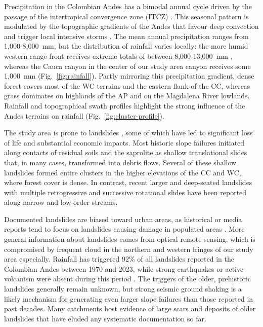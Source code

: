 \documentclass[draft]{agujournal2019}
\begin{document}
\par Precipitation in the Colombian Andes has a bimodal annual cycle driven by the passage of the intertropical convergence zone (ITCZ) \cite{bedoya2019}. This seasonal pattern is modulated by the topographic gradients of the Andes that favour deep convection and trigger local intensive storms \cite{Poveda2011}. The mean annual precipitation ranges from 1,000-8,000~mm, but the distribution of rainfall varies locally: the more humid western range front receives extreme totals of between 8,000-13,000~mm \cite{poveda2000existence,smith2006progress}, whereas the Cauca canyon in the center of our study area canyon receives some 1,000~mm (Fig.~\ref{fig:rainfall}). Partly mirroring this precipitation gradient, dense forest covers most of the WC terrains and the eastern flank of the CC, whereas grass dominates on highlands of the AP and on the Magdalena River lowlands. Rainfall and topographical swath profiles highlight the strong influence of the Andes terrains on rainfall (Fig.~\ref{fig:cluster-profile}).

\par The study area is prone to landslides \cite{aristizabal2020spatial, gomez2023spatial}, some of which have led to significant loss of life and substantial economic impacts. Most historic slope failures initiated along contacts of residual soils and the saprolite as shallow translational slides that, in many cases, transformed into debris flows. Several of these shallow landslides formed entire clusters in the higher elevations of the CC and WC, where forest cover is dense. In contrast, recent larger and deep-seated landslides with multiple retrogressive and successive rotational slides have been reported along narrow and low-order streams.

\par Documented landslides are biased toward urban areas, as historical or media reports tend to focus on landslides causing damage in populated areas \cite{guzzetti2012landslide, froude2018global}. More general information about landslides comes from optical remote sensing, which is compromised by frequent cloud in the northern and western fringes of our study area especially. Rainfall has triggered 92\% of all landslides reported in the Colombian Andes between 1970 and 2023, while strong earthquakes or active volcanism were absent during this period \cite{aristizabal2020}. The triggers of the older, prehistoric landslides generally remain unknown, but strong seismic ground shaking is a likely mechanism for generating even larger slope failures than those reported in past decades. Many catchments host evidence of large scars and deposits of older landslides that have eluded any systematic documentation so far.
\end{document}
